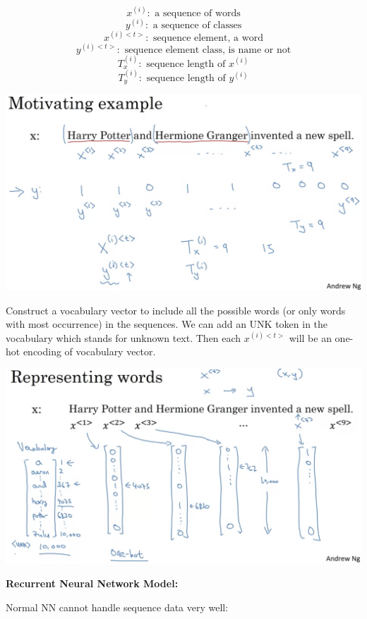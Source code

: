 \documentclass{article}
\begin{document}
\[x^{(i)}: \text{ a sequence of words}\]
\[y^{(i)}: \text{ a sequence of classes}\]
\[x^{(i)<t>}: \text{ sequence element, a word}\]
\[y^{(i)<t>}: \text{ sequence element class, is name or not}\]
\[T_{x}^{(i)}: \text{ sequence length of } x^{(i)}\]
\[T_{y}^{(i)}: \text{ sequence length of } y^{(i)}\]

\begin{center}
\includegraphics[scale=0.3]{./images/sequence_notation_1.png}
\end{center}

\noindent Construct a vocabulary vector to include all the possible words (or only words with most occurrence) in the sequences. We can add an UNK token in the vocabulary which stands for unknown text. Then each \(x^{(i)<t>}\) will be an one-hot encoding of vocabulary vector.

\begin{center}
\includegraphics[scale=0.3]{./images/sequence_notation_2.png}
\end{center}

\noindent \textbf{Recurrent Neural Network Model:}

\noindent Normal NN cannot handle sequence data very well:
\end{document}

